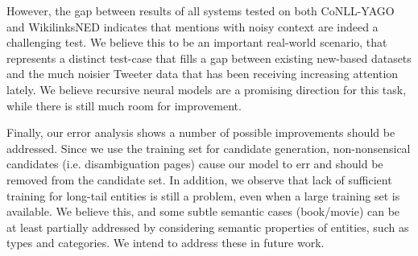 \documentclass[11pt]{article}
\begin{document}
	However, the gap between results of all systems tested on both CoNLL-YAGO and WikilinksNED indicates that mentions with noisy context are indeed a challenging test. We believe this to be an important real-world scenario, that represents a distinct test-case that fills a gap between existing new-based datasets and the much noisier Tweeter data that has been receiving increasing attention lately. We believe recursive neural models are a promising direction for this task, while there is still much room for improvement. 
	
	Finally, our error analysis shows a number of possible improvements should be addressed. Since we use the training set for candidate generation, non-nonsensical candidates (i.e. disambiguation pages) cause our model to err and should be removed from the candidate set. In addition, we observe that lack of sufficient training for long-tail entities is still a problem, even when a large training set is available. We believe this, and some subtle semantic cases (book/movie) can be at least partially addressed by considering semantic properties of entities, such as types and categories. We intend to address these in future work.
	
	
	
	
\end{document}
